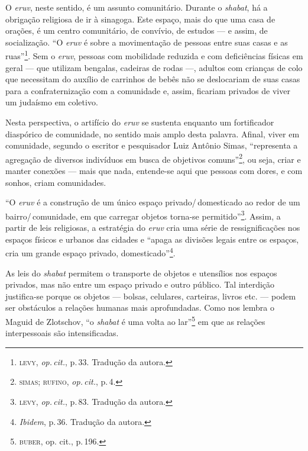O \emph{eruv}, neste sentido, é um assunto comunitário. Durante o
\emph{shabat}, há a obrigação religiosa de ir à sinagoga. Este espaço,
mais do que uma casa de orações, é um centro comunitário, de convívio,
de estudos --- e assim, de socialização. ``O \emph{eruv} é sobre a
movimentação de pessoas entre suas casas e as ruas''\footnote{\textsc{levy}, \emph{op.\,cit.}, p.\,33. Tradução da autora.}. Sem o \emph{eruv}, pessoas com mobilidade reduzida e com deficiências físicas em geral --- que utilizam bengalas, cadeiras de rodas ---, adultos com crianças de colo que necessitam do
auxílio de carrinhos de bebês não se deslocariam de suas casas para a
confraternização com a comunidade e, assim, ficariam privados de viver
um judaísmo em coletivo.

Nesta perspectiva, o artifício do \emph{eruv} se sustenta enquanto um
fortificador diaspórico de comunidade, no sentido mais amplo desta
palavra. Afinal, viver em comunidade, segundo o escritor e pesquisador
Luiz Antônio Simas, ``representa a agregação de diversos
indivíduos em busca de objetivos comuns''\footnote{\textsc{simas}; \textsc{rufino}, \emph{op.\,cit.}, p.\,4.}, ou seja, criar e manter conexões --- mais que nada,
entende-se aqui que pessoas com dores, e com sonhos, criam comunidades.

\begin{center}\end{center}

\noindent{}``O \emph{eruv} é a construção de um único espaço privado/\,domesticado ao
redor de um bairro/\,comunidade, em que carregar objetos torna-se
permitido''\footnote{\textsc{levy}, \emph{op.\,cit.}, p.\,83. Tradução da autora.}. Assim, a
partir de leis religiosas, a estratégia do \emph{eruv} cria uma série de
ressignificações nos espaços físicos e urbanos das cidades
e ``apaga as divisões legais entre os espaços, cria um grande
espaço privado, domesticado''\footnote{\emph{Ibidem}, p.\,36. Tradução da autora.}.

As leis do \emph{shabat} permitem o transporte de
objetos e utensílios nos espaços privados, mas não entre um espaço
privado e outro público. Tal interdição justifica-se porque os objetos
--- bolsas, celulares, carteiras, livros etc. --- podem ser obstáculos a
relações humanas mais aprofundadas. Como nos lembra o Maguid de
Zlotschov, ``o \emph{shabat} é uma volta ao lar''\footnote{\textsc{buber}, op.
  cit., p.\,196.} em que as relações interpessoais são intensificadas.

